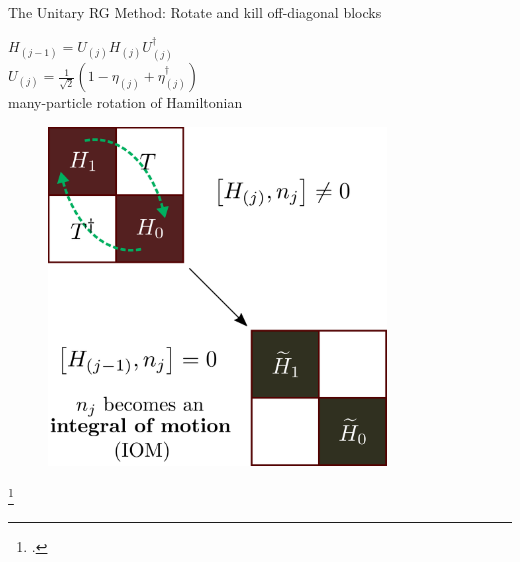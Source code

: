 \documentclass[11pt,aspectratio=169]{beamer}
\begin{document}
\begin{frame}{The Unitary RG Method: Rotate and kill off-diagonal blocks}

\vspace*{\fill}

\begin{minipage}{0.5\textwidth}
\centering
\(H_{(j-1)} = U_{(j)} H_{(j)} U_{(j)}^\dagger\)\\[20pt]
\(U_{(j)} = \frac{1}{\sqrt 2}\left(1 - \eta_{(j)} + \eta_{(j)}^\dagger\right)\)\\[20pt]
many-particle rotation of Hamiltonian
\vspace*{\fill}
\end{minipage}
\hspace*{\fill}
\begin{minipage}{0.45\textwidth}
\begin{figure}
	\includegraphics[width=0.8\textwidth]{figures/urg_rot.pdf}
\end{figure}
\end{minipage}

\footcite{anirbanurg1,anirbanurg2}
\end{frame}
\end{document}
